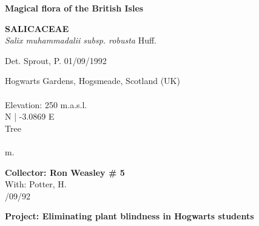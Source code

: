 \documentclass[
]{article}
\begin{document}
\pagebreak
\begin{mdframed}[linewidth=2pt,linecolor=black, innerleftmargin = 1.5 cm, innerrightmargin = 1.5 cm]

\begin{center}
\bigskip
{\fontsize{30pt}{100pt}\selectfont\bf Magical flora of the British Isles } \\
\end{center}
\begin{flushleft}
{\fontsize{35pt}{100pt}\selectfont\bf SALICACEAE  } \\
\vfill
{\fontsize{35pt}{100pt}\selectfont\emph{ Salix muhammadalii subsp. robusta }  Huff. } \\
\end{flushleft}
\begin{flushright}
{\fontsize{22.55pt}{100pt}\selectfont Det. Sprout, P.   01/09/1992 } \\
\end{flushright}
\vfill
\bigskip
\bigskip
\begin{flushleft}
{\fontsize{25pt}{100pt}\selectfont Hogwarts Gardens, Hogsmeade, Scotland (UK) } \\
{\fontsize{25pt}{100pt}\selectfont ~ } \\
{\fontsize{25pt}{100pt}\selectfont Elevation: 250 m.a.s.l. }\\
{\fontsize{25pt}{100pt} N  |  -3.0869 E } \\
\vfill
{\fontsize{25pt}{100pt}\selectfont Tree } \\
{\fontsize{25pt}{100pt}\selectfont ~ } \\
{\fontsize{25pt}{100pt} m. } \\
\end{flushleft}
\vfill
\begin{flushright}
{\fontsize{20pt}{100pt}\selectfont\bf Collector:  Ron Weasley  \# 5 } \\
{\fontsize{20pt}{100pt}\selectfont With:  Potter, H. } \\
{\fontsize{20pt}{100pt}/09/92 } \\
\end{flushright}
\vfill
\begin{center}
{\fontsize{25pt}{80pt}\selectfont\bf  Project: Eliminating plant blindness in Hogwarts students } \\
\end{center}
\end{mdframed}
\end{document}
